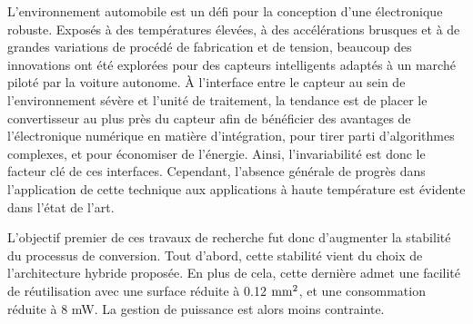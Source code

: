 \begin{mdframed}[linecolor=Prune,linewidth=1]
    L'environnement automobile est un défi pour la conception d'une électronique robuste. Exposés à des températures élevées, à des accélérations brusques et à de grandes variations de procédé de fabrication et de tension, beaucoup des innovations ont été explorées pour des capteurs intelligents adaptés à un marché piloté par la voiture autonome. À l'interface entre le capteur au sein de l'environnement sévère et l'unité de traitement, la tendance est de placer le convertisseur au plus près du capteur afin de bénéficier des avantages de l'électronique numérique en matière d'intégration, pour tirer parti d'algorithmes complexes, et pour économiser de l'énergie. Ainsi, l'invariabilité est donc le facteur clé de ces interfaces. Cependant, l’absence générale de progrès dans l’application de cette technique aux applications à haute température est évidente dans l'état de l'art.
    
    L'objectif premier de ces travaux de recherche fut donc d'augmenter la stabilité du processus de conversion. Tout d'abord, cette stabilité vient du choix de l'architecture hybride proposée. En plus de cela, cette dernière admet une facilité de réutilisation avec une surface réduite à 0.12 $\rm mm^2$, et une consommation réduite à 8 mW. La gestion de puissance est alors moins contrainte.
    \end{mdframed}